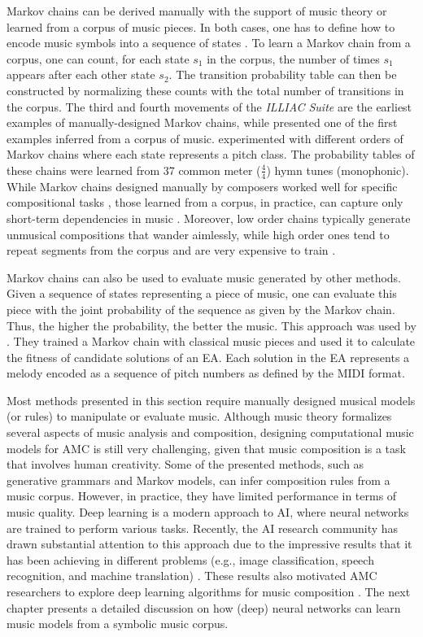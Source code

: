 Markov chains can be derived manually with the support of music theory  or learned from a corpus of music pieces. In both cases, one has to define how to encode music symbols into a sequence of states \cite{ames1989markov}. To learn a Markov chain from a corpus, one can count, for each state $s_1$ in the corpus, the number of times $s_1$ appears after each other state $s_2$. The transition probability table can then be constructed by normalizing these counts with the total number of transitions in the corpus.
The third and fourth movements of the \textit{ILLIAC Suite} are the earliest examples of
manually-designed Markov chains, while \citet{brooks1957} presented one of the first examples inferred from a corpus of music. \citet{brooks1957} experimented with different orders of Markov chains where each state represents a pitch class. The probability tables of these chains were learned from 37 common meter ($\frac{4}{4}$) hymn tunes (monophonic). While Markov chains designed manually by composers
worked well for specific compositional tasks \cite{tipei1975mp1, jones1981compositional, langston1989six},
those learned from a corpus, in practice, can capture only short-term dependencies in music
\cite{moorer1972music}. Moreover, low order chains typically generate unmusical compositions that
wander aimlessly, while high order ones tend to repeat segments from the corpus and are
very expensive to train \cite{moorer1972music}.

Markov chains can also be used to evaluate music generated by other methods. Given a sequence of states representing a piece of music, one can evaluate this piece with the joint probability of the sequence as given by the Markov chain. Thus, the higher the probability, the better the music. This approach was used by \citet{lo2006evolving}. They trained a Markov chain with classical music pieces and used it to calculate the fitness of candidate solutions of an EA. Each solution in the EA represents a melody encoded as a sequence of pitch numbers as defined by the MIDI format.

Most methods presented in this section require manually designed musical models (or rules) to manipulate or evaluate music. Although music theory formalizes several aspects of music analysis and composition, designing computational music models for AMC is still very challenging, given that music composition is a task that involves human creativity. Some of the presented methods, such as generative grammars and Markov models, can infer composition rules from a music corpus. However, in practice, they have limited performance in terms of music quality. Deep learning is a modern approach to AI, where neural networks are trained to perform various tasks. Recently, the AI research community has drawn substantial attention to this approach due to the impressive results that it has been achieving in different problems (e.g., image classification, speech recognition, and machine translation) \cite{lecun2015deep}. These results also motivated AMC researchers to explore deep learning algorithms for music composition \cite{briot2017deep}. The next chapter presents a detailed discussion on how (deep) neural networks can learn music models from a symbolic music corpus.
